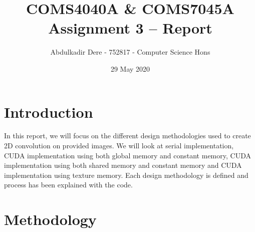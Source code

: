 

\title{COMS4040A \& COMS7045A Assignment 3 -- Report}
\author{Abdulkadir Dere - 752817 - Computer Science Hons}
\date{29 May 2020} 
\maketitle 
\pagestyle{fancy}
\fancyhf{}
\fancyhead[R]{\thepage}





\section{Introduction} 
In this report, we will focus on the different design methodologies used to create 2D convolution on provided images. We will look at serial implementation, CUDA implementation using both global memory and constant memory, CUDA implementation using both shared memory and constant memory and CUDA implementation using texture memory. Each design methodology is defined and process has been explained with the code.

\section{Methodology}
